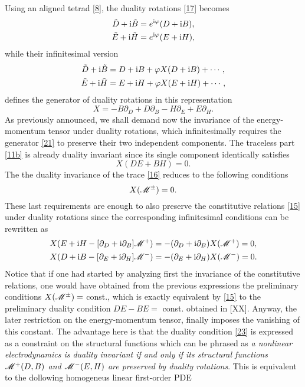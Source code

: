 Using an aligned tetrad \eqref{8}, the duality rotations \eqref{17} becomes
\begin{subequations}\label{19}
	\begin{align}
  \tilde{D}+\mathrm{i}\tilde{B}&=e^{\mathrm{i} \varphi}(D+\mathrm{i} B),\\
  \tilde{E}+\mathrm{i} \tilde{H}&=e^{\mathrm{i} \varphi}(E+\mathrm{i} H),
\end{align}
\end{subequations}
while their infinitesimal version
\begin{subequations}\label{20}
	\begin{align}
  \tilde{D}+\mathrm{i}\tilde{B}&=D+\mathrm{i} B+\varphi X(D+\mathrm{i} B)+\cdots,\\
  \tilde{E}+\mathrm{i} \tilde{H}&=E+\mathrm{i} H+\varphi X(E+\mathrm{i} H)+\cdots,
\end{align}
\end{subequations}
defines the generator of duality rotations in this representation
\begin{equation}\label{21}
  X=-B\partial_D+D\partial_B-H\partial_E+E\partial_H.
\end{equation}
As previously announced, we shall demand now the invariance of the energy-momentum tensor under duality rotations, which infinitesimally requires the generator \eqref{21} to preserve their two independent components. The traceless part \eqref{11b} is already duality invariant since its single component identically satisfies
\begin{equation}\label{22}
  X(DE+BH)=0.
\end{equation}
The the duality invariance of the trace \eqref{16} reduces to the following conditions
\begin{equation}\label{23}
  X(\mathscr{M}^{\pm })=0.
\end{equation}
These last requirements are enough to also preserve the constitutive relations \eqref{15} under duality rotations since the corresponding infinitesimal conditions can be rewritten as
\begin{subequations}
	\begin{align}
  X(E+\mathrm{i} H-[\partial_D+\mathrm{i} \partial_B]\mathscr{M}^+)&=-(\partial_D+\mathrm{i} \partial_B)X(\mathscr{M}^+)=0,\\
  X(D+\mathrm{i} B-[\partial_E+\mathrm{i} \partial_H]\mathscr{M}^-)&=-(\partial_E+\mathrm{i} \partial_H)X(\mathscr{M}^-)=0.
\end{align}
\end{subequations}
Notice that if one had started by analyzing first the invariance of the constitutive relations, one would have obtained from the previous expressions the preliminary conditions $X(\mathscr{M} ^{\pm })=$ const., which is exactly equivalent by \eqref{15} to the preliminary duality condition $DE-BE=$ const. obtained in [XX]. Anyway, the later restriction on the energy-momentum tensor, finally imposes the vanishing of this constant. The advantage here is that the duality condition \eqref{23} is expressed as a constraint on the structural functions which can be phrased as \textit{a nonlinear electrodynamics is duality invariant if and only if its structural functions $\mathscr{M}^+(D,B)$ and $\mathscr{M}^-(E,H)$ are preserved by duality rotations}. This is equivalent to the dollowing homogeneus linear first-order PDE
